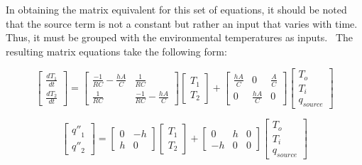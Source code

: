 In obtaining the matrix equivalent for this set of equations, it should be noted that the source term is not a constant but rather an input that varies with time.~ Thus, it must be grouped with the environmental temperatures as inputs.~ The resulting matrix equations take the following form:

\begin{equation}
\left[ {\begin{array}{ccc}{\frac{{d{T_1}}}{{dt}}}\\ {\frac{{d{T_2}}}{{dt}}}\end{array}} \right] = \left[ {\begin{array}{ccc}{\frac{{ - 1}}{{RC}} - \frac{{hA}}{C}}&{\frac{1}{{RC}}}\\ {\frac{1}{{RC}}}&{\frac{{ - 1}}{{RC}} - \frac{{hA}}{C}}\end{array}} \right]\left[ {\begin{array}{ccc}{{T_1}}\\ {{T_2}}\end{array}} \right] + \left[ {\begin{array}{ccc}{\frac{{hA}}{C}}&0&{\frac{A}{C}}\\0&{\frac{{hA}}{C}}&0\end{array}} \right]\left[ {\begin{array}{ccc}{{T_o}}\\ {{T_i}}\\ {{q_{source}}}\end{array}} \right]
\label{eq:QTFDeriv658}
\end{equation}

\begin{equation}
\left[ {\begin{array}{ccc}{{{q''}_1}}\\ {{{q''}_2}}\end{array}} \right] = \left[ {\begin{array}{ccc}0&{ - h}\\h&0\end{array}} \right]\left[ {\begin{array}{ccc}{{T_1}}\\ {{T_2}}\end{array}} \right] + \left[ {\begin{array}{ccc}0&h&0\\ { - h}&0&0\end{array}} \right]\left[ {\begin{array}{ccc}{{T_o}}\\ {{T_i}}\\ {{q_{source}}}\end{array}} \right]
\label{eq:LaplaceTransformDeriv659}
\end{equation}

